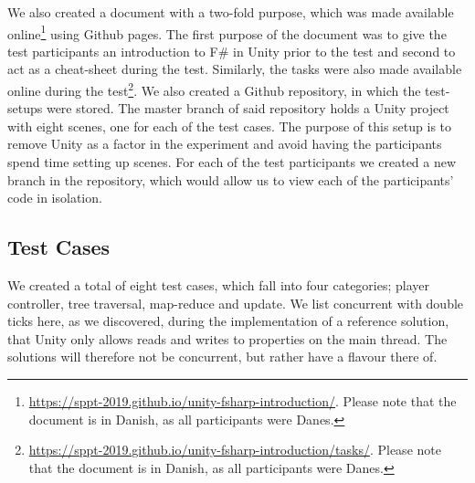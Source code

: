 We also created a document with a two-fold purpose, which was made available online\footnote{\url{https://sppt-2019.github.io/unity-fsharp-introduction/}. Please note that the document is in Danish, as all participants were Danes.} using Github pages. The first purpose of the document was to give the test participants an introduction to F\# in Unity prior to the test and second to act as a cheat-sheet during the test. Similarly, the tasks were also made available online during the test\footnote{\url{https://sppt-2019.github.io/unity-fsharp-introduction/tasks/}. Please note that the document is in Danish, as all participants were Danes.}. We also created a Github repository, in which the test-setups were stored. The master branch of said repository holds a Unity project with eight scenes, one for each of the test cases. The purpose of this setup is to remove Unity as a factor in the experiment and avoid having the participants spend time setting up scenes. For each of the test participants we created a new branch in the repository, which would allow us to view each of the participants' code in isolation.
 
\subsection{Test Cases}
We created a total of eight test cases, which fall into four categories; player controller, tree traversal, map-reduce and  update. We list concurrent with double ticks here, as we discovered, during the implementation of a reference solution, that Unity only allows reads and writes to  properties on the main thread. The solutions will therefore not be concurrent, but rather have a flavour there of.

